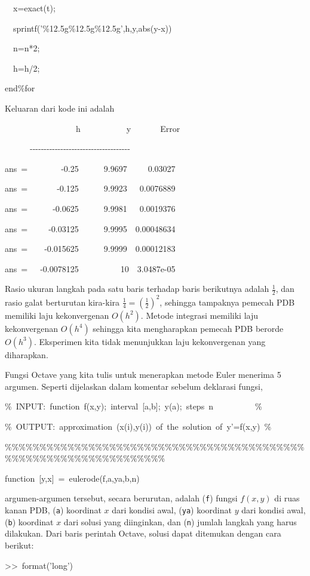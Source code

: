 \begin{description}
\begin{lyxcode}
~~x=exact(t);

~~sprintf('\%12.5g\%12.5g\%12.5g',h,y,abs(y-x))

~~n=n{*}2;

~~h=h/2;

end\%for
\end{lyxcode}
Keluaran dari kode ini adalah
\begin{lyxcode}
~~~~~~~~~~~~~~~~~h~~~~~~~~~~~y~~~~~~~Error

~~~~~~-{}-{}-{}-{}-{}-{}-{}-{}-{}-{}-{}-{}-{}-{}-{}-{}-{}-{}-{}-{}-{}-{}-{}-{}-{}-{}-{}-{}-{}-{}-{}-{}-{}-{}-{}-

ans~=~~~~~~~~-0.25~~~~~~9.9697~~~~~0.03027

ans~=~~~~~~~-0.125~~~~~~9.9923~~~0.0076889

ans~=~~~~~~-0.0625~~~~~~9.9981~~~0.0019376

ans~=~~~~~-0.03125~~~~~~9.9995~~0.00048634

ans~=~~~~-0.015625~~~~~~9.9999~~0.00012183

ans~=~~~-0.0078125~~~~~~~~~~10~~3.0487e-05
\end{lyxcode}
Rasio ukuran langkah pada satu baris terhadap baris berikutnya adalah
$\frac{1}{2}$, dan rasio galat berturutan kira-kira $\frac{1}{4}=\left(\frac{1}{2}\right)^{2}$,
sehingga tampaknya pemecah PDB memiliki laju kekonvergenan $O(h^{2})$.
Metode integrasi memiliki laju kekonvergenan $O(h^{4})$ sehingga
kita mengharapkan pemecah PDB berorde $O(h^{3})$. Eksperimen kita
tidak menunjukkan laju kekonvergenan yang diharapkan.
\item [{\ref{exc:ode-rungeKutta-17}a:}] Fungsi Octave yang kita tulis
untuk menerapkan metode Euler menerima 5 argumen. Seperti dijelaskan
dalam komentar sebelum deklarasi fungsi,

\begin{lyxcode}
\%~INPUT:~function~f(x,y);~interval~{[}a,b{]};~y(a);~steps~n~~~~~~~~~~\%

\%~OUTPUT:~approximation~(x(i),y(i))~of~the~solution~of~y'=f(x,y)~\%

\%\%\%\%\%\%\%\%\%\%\%\%\%\%\%\%\%\%\%\%\%\%\%\%\%\%\%\%\%\%\%\%\%\%\%\%\%\%\%\%\%\%\%\%\%\%\%\%\%\%\%\%\%\%\%\%\%\%\%\%\%\%\%\%\%\%

function~{[}y,x{]}~=~eulerode(f,a,ya,b,n)~
\end{lyxcode}
argumen-argumen tersebut, secara berurutan, adalah (\texttt{f}) fungsi
$f(x,y)$ di ruas kanan PDB, (\texttt{a}) koordinat $x$ dari kondisi
awal, (\texttt{ya}) koordinat $y$ dari kondisi awal, (\texttt{b})
koordinat $x$ dari solusi yang diinginkan, dan (\texttt{n}) jumlah
langkah yang harus dilakukan. Dari baris perintah Octave, solusi dapat
ditemukan dengan cara berikut:
\begin{lyxcode}
>\textcompwordmark >~format('long')


\end{lyxcode}
\end{description}
